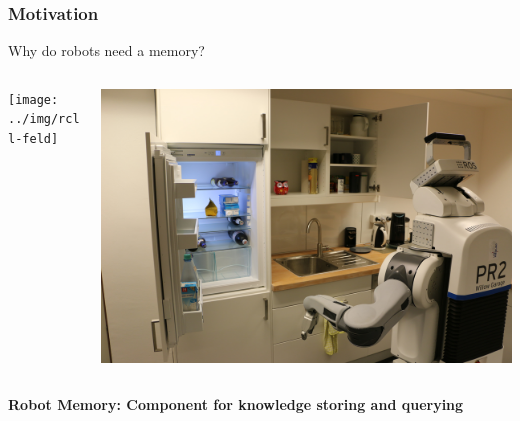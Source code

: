 \begin{frame}
  \frametitle{Motivation}
  \Large{Why do robots need a memory?}
  \vspace{1cm}
  \begin{columns}
    \begin{column}{0.5\textwidth}
    \texttt{[image: ../img/rcll-feld]}
    \end{column}
    \begin{column}{0.5\textwidth}
    \includegraphics[width=\textwidth]{../img/pr2-kbsg-kitchen}
    \end{column}
  \end{columns}
  \begin{block}{} \centering\bfseries Robot Memory: Component for knowledge storing and querying 
  \end{block}
\end{frame}

